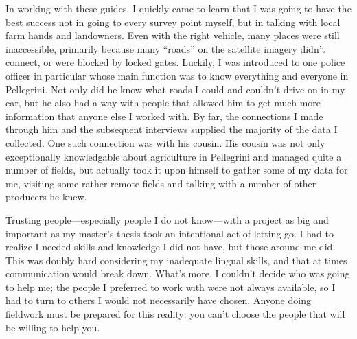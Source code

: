In working with these guides, I quickly came to learn that I was going to have the best success not in going to every survey point myself, but in talking with local farm hands and landowners. Even with the right vehicle, many places were still inaccessible, primarily because many “roads” on the satellite imagery didn’t connect, or were blocked by locked gates. Luckily, I was introduced to one police officer in particular whose main function was to know everything and everyone in Pellegrini. Not only did he know what roads I could and couldn’t drive on in my car, but he also had a way with people that allowed him to get much more information that anyone else I worked with. By far, the connections I made through him and the subsequent interviews supplied the majority of the data I collected. One such connection was with his cousin. His cousin was not only exceptionally knowledgable about agriculture in Pellegrini and managed quite a number of fields, but actually took it upon himself to gather some of my data for me, visiting some rather remote fields and talking with a number of other producers he knew.

Trusting people—especially people I do not know—with a project as big and important as my master’s thesis took an intentional act of letting go. I had to realize I needed skills and knowledge I did not have, but those around me did. This was doubly hard considering my inadequate lingual skills, and that at times communication would break down. What’s more, I couldn’t decide who was going to help me; the people I preferred to work with were not always available, so I had to turn to others I would not necessarily have chosen. Anyone doing fieldwork must be prepared for this reality: you can’t choose the people that will be willing to help you.

